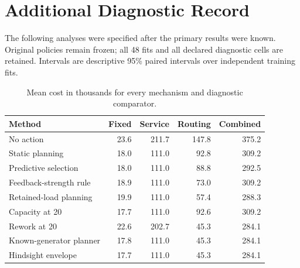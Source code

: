 \section{Additional Diagnostic Record}
The following analyses were specified after the primary results were known. Original policies remain frozen; all 48 fits and all declared diagnostic cells are retained. Intervals are descriptive 95\% paired intervals over independent training fits.

\begin{table}[p]\caption{Mean cost in thousands for every mechanism and diagnostic comparator.}\centering\small\setlength{\tabcolsep}{3pt}\begin{tabular}{p{}rrrr}\toprule
Method & Fixed & Service & Routing & Combined\\\midrule
No action & 23.6 & 211.7 & 147.8 & 375.2\\
Static planning & 18.0 & 111.0 & 92.8 & 309.2\\
Predictive selection & 18.0 & 111.0 & 88.8 & 292.5\\
Feedback-strength rule & 18.9 & 111.0 & 73.0 & 309.2\\
Retained-load planning & 19.9 & 111.0 & 57.4 & 288.3\\
Capacity at 20 & 17.7 & 111.0 & 92.6 & 309.2\\
Rework at 20 & 22.6 & 202.7 & 45.3 & 284.1\\
Known-generator planner & 17.8 & 111.0 & 45.3 & 284.1\\
Hindsight envelope & 17.7 & 111.0 & 45.3 & 284.1\\
\bottomrule\end{tabular}\end{table}
